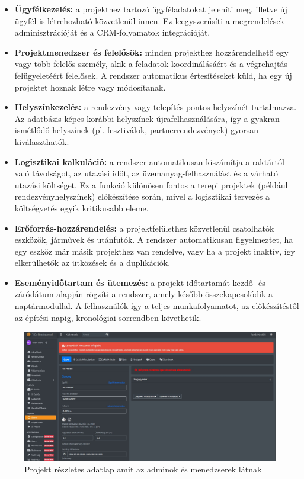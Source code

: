 \begin{itemize}
    \item \textbf{Ügyfélkezelés:} a projekthez tartozó ügyféladatokat jeleníti meg, illetve új ügyfél is létrehozható közvetlenül innen.  
    Ez leegyszerűsíti a megrendelések adminisztrációját és a CRM-folyamatok integrációját.

    \item \textbf{Projektmenedzser és felelősök:} minden projekthez hozzárendelhető egy vagy több felelős személy, 
    akik a feladatok koordinálásáért és a végrehajtás felügyeletéért felelősek.  
    A rendszer automatikus értesítéseket küld, ha egy új projektet hoznak létre vagy módosítanak.

    \item \textbf{Helyszínkezelés:} a rendezvény vagy telepítés pontos helyszínét tartalmazza.  
    Az adatbázis képes korábbi helyszínek újrafelhasználására, így a gyakran ismétlődő helyszínek (pl. fesztiválok, partnerrendezvények) gyorsan kiválaszthatók.

    \item \textbf{Logisztikai kalkuláció:} a rendszer automatikusan kiszámítja a raktártól való távolságot, az utazási időt, az üzemanyag-felhasználást és a várható utazási költséget.  
    Ez a funkció különösen fontos a terepi projektek (például rendezvényhelyszínek) előkészítése során, 
    mivel a logisztikai tervezés a költségvetés egyik kritikusabb eleme.

    \item \textbf{Erőforrás-hozzárendelés:} a projektfelülethez közvetlenül csatolhatók eszközök, járművek és utánfutók.  
    A rendszer automatikusan figyelmeztet, ha egy eszköz már másik projekthez van rendelve, vagy ha a projekt inaktív, így elkerülhetők az ütközések és a duplikációk.

    \item \textbf{Eseményidőtartam és ütemezés:} a projekt időtartamát kezdő- és záródátum alapján rögzíti a rendszer, 
    amely később összekapcsolódik a naptármodullal.  
    A felhasználók így a teljes munkafolyamatot, az előkészítéstől az építési napig, kronológiai sorrendben követhetik.
\end{itemize}
\begin{figure}[H]
    \centering
    \includegraphics[width=150mm, keepaspectratio]{figures/project.jpg}
    \caption{Projekt részletes adatlap amit az adminok és menedzserek látnak}
    \label{fig:project}
\end{figure}
